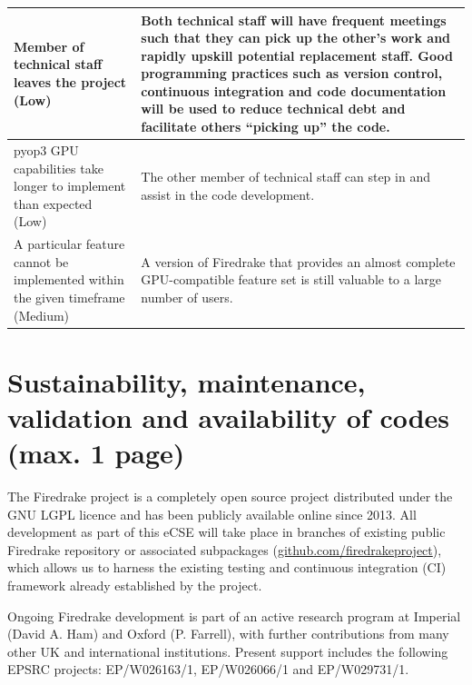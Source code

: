 \documentclass[a4paper,11pt]{article}
\begin{document}
\begin{landscape}
\begin{multicols}{2}
\begin{tabularx}{\columnwidth}{|p{3cm}|X|}
\hline
Member of technical staff leaves the project (Low) &
Both technical staff will have frequent meetings such that they can pick up the other’s work and rapidly upskill potential replacement staff.
Good programming practices such as version control, continuous integration and code documentation will be used to reduce technical debt and facilitate others “picking up” the code. \\
\hline
pyop3 GPU capabilities take longer to implement than expected (Low) &
The other member of technical staff can step in and assist in the code development.\\
\hline
A particular feature cannot be implemented within the given timeframe (Medium) &
A version of Firedrake that provides an almost complete GPU-compatible feature set is still valuable to a large number of users.\\
\hline
\end{tabularx}
\end{multicols}
\end{landscape}


\clearpage
\section{Sustainability, maintenance, validation and {{availability}} of codes (max. 1 page)}
The Firedrake project is a completely open source project distributed under the GNU LGPL licence and has been publicly available online since 2013.
All development as part of this eCSE will take place in branches of existing public Firedrake repository or associated subpackages (\url{github.com/firedrakeproject}), which allows us to harness the existing testing and continuous integration (CI) framework already established by the project. 

Ongoing Firedrake development is part of an active research program at Imperial (David A. Ham) and Oxford (P. Farrell), with further contributions from many other UK and international institutions. Present support includes the following EPSRC projects: EP/W026163/1, EP/W026066/1 and EP/W029731/1. 
\end{document}
